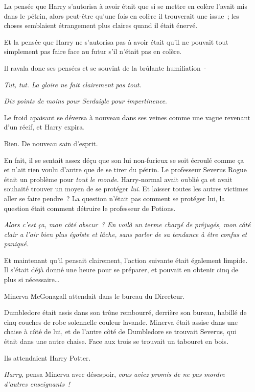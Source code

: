 La pensée que Harry s'autorisa à avoir était que si se mettre en colère l'avait mis dans le pétrin, alors peut-être qu'une fois en colère il trouverait une issue~; les choses semblaient étrangement plus claires quand il était énervé.

Et la pensée que Harry ne s'autorisa pas à avoir était qu'il ne pouvait tout simplement pas faire face au futur s'il n'était pas en colère.

Il ravala donc ses pensées et se souvint de la brûlante humiliation~-

\emph{Tut, tut. La gloire ne fait clairement pas tout.}

\emph{Dix points de moins pour Serdaigle pour impertinence.}

Le froid apaisant se déversa à nouveau dans ses veines comme une vague revenant d'un récif, et Harry expira.

Bien. De nouveau sain d'esprit.

En fait, il se sentait assez déçu que son lui non-furieux se soit écroulé comme ça et n'ait rien voulu d'autre que de se tirer du pétrin. Le professeur Severus Rogue était un problème pour \emph{tout le monde}. Harry-normal avait oublié ça et avait souhaité trouver un moyen de se protéger \emph{lui}. Et laisser toutes les autres victimes aller se faire pendre~? La question n'était pas comment se protéger lui, la question était comment détruire le professeur de Potions.

\emph{Alors c'est ça, mon côté obscur~? En voilà un terme chargé de préjugés, mon côté clair a l'air bien plus égoïste et lâche, sans parler de sa tendance à être confus et paniqué.}

Et maintenant qu'il pensait clairement, l'action suivante était également limpide. Il s'était déjà donné une heure pour se préparer, et pouvait en obtenir cinq de plus si nécessaire…

\later

Minerva McGonagall attendait dans le bureau du Directeur.

Dumbledore était assis dans son trône rembourré, derrière son bureau, habillé de cinq couches de robe solennelle couleur lavande. Minerva était assise dans une chaise à côté de lui, et de l'autre côté de Dumbledore se trouvait Severus, qui était dans une autre chaise. Face aux trois se trouvait un tabouret en bois.

Ils attendaient Harry Potter.

\emph{Harry}, pensa Minerva avec désespoir, \emph{vous aviez promis de ne pas mordre d'autres enseignants~!}

